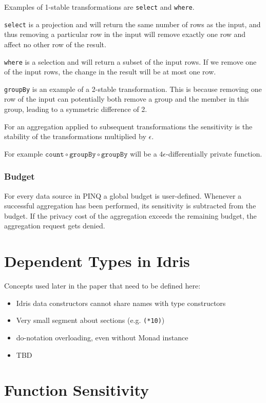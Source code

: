 \documentclass[12pt]{article}
\begin{document}
Examples of 1-stable transformations are \texttt{select} and \texttt{where}.

\texttt{select} is a projection and will return the same number of rows as the input, and thus removing a particular row in the input will remove exactly one row and affect no other row of the result.

\texttt{where} is a selection and will return a subset of the input rows.
If we remove one of the input rows, the change in the result will be at most one row.

\texttt{groupBy} is an example of a 2-stable transformation.
This is because removing one row of the input can potentially both remove a group and the member in this group, leading to a symmetric difference of 2.

For an aggregation applied to subsequent transformations the sensitivity is the stability of the transformations multiplied by $\epsilon$.

For example $\texttt{count} \circ \texttt{groupBy} \circ \texttt{groupBy}$ will be a $4\epsilon$-differentially private function.

\subsubsection{Budget}

For every data source in PINQ a global budget is user-defined.
Whenever a successful aggregation has been performed, its sensitivity is subtracted from the budget.
If the privacy cost of the aggregation exceeds the remaining budget, the aggregation request gets denied.

\section{Dependent Types in Idris}\label{sec:dependent_types_in_idris}

Concepts used later in the paper that need to be defined here:
\begin{itemize}
\item Idris data constructors cannot share names with type constructors
\item Very small segment about sections (e.g. \texttt{(*10)})
\item do-notation overloading, even without Monad instance
\item TBD
\end{itemize}

\section{Function Sensitivity}\label{sec:function_sensitivity}
\end{document}

